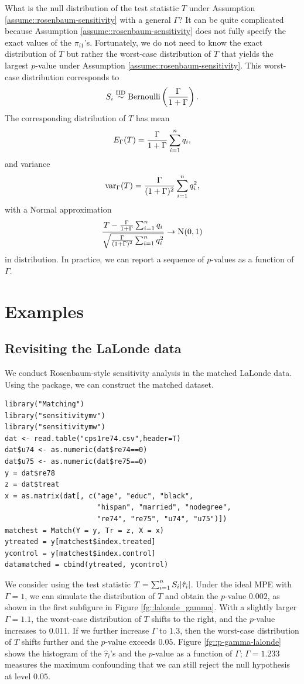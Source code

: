 What is the null distribution of the test statistic $T$ under Assumption \ref{assume::rosenbaum-sensitivity} with a general $\Gamma$? It can be quite complicated because Assumption \ref{assume::rosenbaum-sensitivity}  does not fully specify the exact values of the $\pi_{i1}$'s. Fortunately, we do not need to know the exact distribution of $T$ but rather the worst-case distribution of $T$ that yields the largest $p$-value under Assumption \ref{assume::rosenbaum-sensitivity}. This worst-case distribution corresponds to
$$
S_i \stackrel{\textup{IID}}{\sim}  \text{Bernoulli}\left(  \frac{ \Gamma}{ 1+\Gamma} \right).
$$
The corresponding distribution of $T$ has mean 
$$
E_\Gamma( T ) = \frac{\Gamma}{1+\Gamma} \sum_{i=1}^n q_i, 
$$
and variance 
$$
\textup{var}_\Gamma( T ) = \frac{\Gamma}{(1+\Gamma)^2} \sum_{i=1}^n q_i^2,
$$
with a Normal approximation
$$
\frac{T -\frac{\Gamma}{1+\Gamma} \sumn q_i }{ \sqrt{ \frac{\Gamma}{(1+\Gamma)^2} \sumn q_i^2  }} \rightarrow  \N01 
$$
in distribution. 
In practice, we can report a sequence of $p$-values as a function of $\Gamma$. 


\section{Examples}

\subsection{Revisiting the LaLonde data}\label{sec::rosenbaum-gamma-examples}

 

We conduct Rosenbaum-style sensitivity analysis in the matched LaLonde data. 
Using the  package, we can construct the matched dataset. 
\begin{lstlisting}
library("Matching")
library("sensitivitymv")
library("sensitivitymw")
dat <- read.table("cps1re74.csv",header=T)
dat$u74 <- as.numeric(dat$re74==0)
dat$u75 <- as.numeric(dat$re75==0)
y = dat$re78
z = dat$treat
x = as.matrix(dat[, c("age", "educ", "black",
                      "hispan", "married", "nodegree",
                      "re74", "re75", "u74", "u75")])
matchest = Match(Y = y, Tr = z, X = x)
ytreated = y[matchest$index.treated]
ycontrol = y[matchest$index.control]
datamatched = cbind(ytreated, ycontrol)
\end{lstlisting}

We consider using the test statistic $T = \sum_{i=1}^n S_i | \hat{\tau}_i |$. Under the ideal MPE with $\Gamma = 1$, we can simulate the distribution of $T$ and obtain the $p$-value $0.002$, as shown in the first subfigure in Figure \ref{fg::lalonde_gamma}. With a slightly larger $\Gamma = 1.1$, the worst-case distribution of $T$ shifts to the right, and the $p$-value increases to $0.011$. If we further increase $\Gamma$ to $1.3$, then the worst-case distribution of $T$ shifts further and the $p$-value exceeds $0.05$. Figure \ref{fg::p-gamma-lalonde} shows the histogram of the $\hat{\tau}_i$'s and the $p$-value as a function of $\Gamma$; $\Gamma  = 1.233$ measures the maximum confounding that we can still reject the null hypothesis at level $0.05$. 

